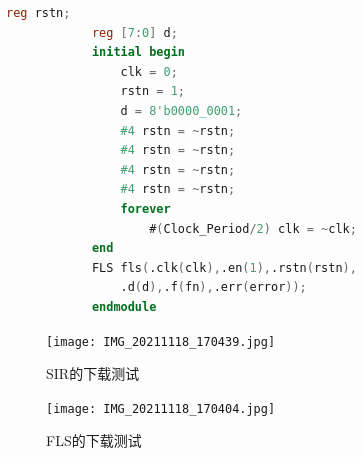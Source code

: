 \documentclass[UTF8,fontset=fandol]{ctexart}
\begin{document}
\begin{itemize}
\begin{lstlisting}[language=Verilog,keywordstyle=\color{red!70}]
            reg rstn;
            reg [7:0] d;
            initial begin
                clk = 0;
                rstn = 1;
                d = 8'b0000_0001;
                #4 rstn = ~rstn;
                #4 rstn = ~rstn;
                #4 rstn = ~rstn;
                #4 rstn = ~rstn;
                forever 
                    #(Clock_Period/2) clk = ~clk;
            end
            FLS fls(.clk(clk),.en(1),.rstn(rstn),
                .d(d),.f(fn),.err(error));
            endmodule
        \end{lstlisting}
        \begin{figure}[H]
            \centering
            \texttt{[image: IMG\_20211118\_170439.jpg]}
            \caption{SIR的下载测试}
        \end{figure}
        \begin{figure}[H]
            \centering
            \texttt{[image: IMG\_20211118\_170404.jpg]}
            \caption{FLS的下载测试}
        \end{figure}
        

\end{itemize}
\end{document}
